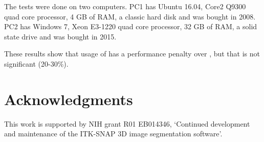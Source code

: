 \documentclass{InsightArticle}
\begin{document}
The tests were done on two computers.
PC1 has Ubuntu 16.04, Core2 Q9300 quad core processor, 4 GB of RAM,
a classic hard disk and was bought in 2008.
PC2 has Windows 7, Xeon E3-1220 quad core processor, 32 GB of RAM,
a solid state drive and was bought in 2015.

These results show that usage of  has a performance
penalty over , but that is not significant (20-30\%).

\section{Acknowledgments}

This work is supported by NIH grant R01 EB014346,
`Continued development and maintenance of the ITK-SNAP 3D image segmentation software'.



\end{document}
